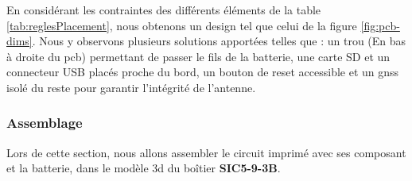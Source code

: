 En considérant les contraintes des différents éléments de la table \ref{tab:reglesPlacement}, nous obtenons un design tel que celui de la figure \ref{fig:pcb-dims}. Nous y observons plusieurs solutions apportées telles que :
un trou (En bas à droite du \gls{pcb}) permettant de passer le fils de la batterie, une carte SD et un connecteur USB placés proche du bord, un bouton de reset accessible et un \gls{gnss} isolé du reste pour garantir l'intégrité de l'antenne. 

\subsubsection{Assemblage}
Lors de cette section, nous allons assembler le circuit imprimé avec ses composant et la batterie, dans le modèle 3d du boîtier \textbf{SIC5-9-3B}.

